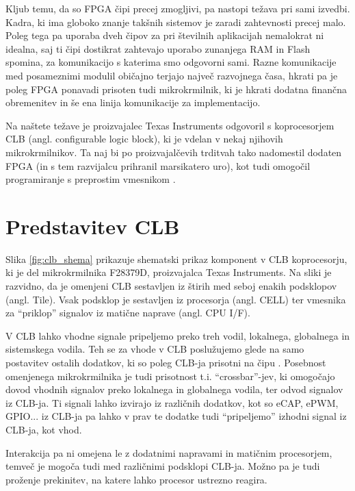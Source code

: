 \documentclass[a4paper]{article}
\begin{document}
Kljub temu, da so FPGA čipi precej zmogljivi, pa nastopi težava pri sami izvedbi. Kadra, ki ima globoko znanje takšnih sistemov je zaradi zahtevnosti precej malo. Poleg tega pa uporaba dveh čipov za pri številnih aplikacijah nemalokrat ni idealna, saj ti čipi dostikrat zahtevajo uporabo zunanjega RAM in Flash spomina, za komunikacijo s katerima smo odgovorni sami. Razne komunikacije med posameznimi modulil običajno terjajo največ razvojnega časa, hkrati pa je poleg FPGA ponavadi prisoten tudi mikrokrmilnik, ki je hkrati dodatna finančna obremenitev in še ena linija komunikacije za implementacijo.

Na naštete težave je proizvajalec Texas Instruments odgovoril s koprocesorjem CLB (angl. configurable logic block), ki je vdelan v nekaj njihovih mikrokrmilnikov. Ta naj bi po proizvajalčevih trditvah tako nadomestil dodaten FPGA (in s tem razvijalcu prihranil marsikatero uro), kot tudi omogočil programiranje s preprostim vmesnikom \cite{clb-intro}.



\section{Predstavitev CLB}\label{sec:predstavitev}
Slika \ref{fig:clb_shema} prikazuje shematski prikaz komponent v CLB koprocesorju, ki je del mikrokrmilnika F28379D, proizvajalca Texas Instruments. Na sliki je razvidno, da je omenjeni CLB sestavljen iz štirih med seboj enakih podsklopov (angl. Tile). Vsak podsklop je sestavljen iz procesorja (angl. CELL) ter vmesnika za ``priklop'' signalov iz matične naprave (angl. CPU I/F).

V CLB lahko vhodne signale pripeljemo preko treh vodil, lokalnega, globalnega in sistemskega vodila. Teh se za vhode v CLB poslužujemo glede na samo postavitev ostalih dodatkov, ki so poleg CLB-ja prisotni na čipu \cite[Pogl.~26.3]{mcu-ref-manual}. Posebnost omenjenega mikrokrmilnika je tudi prisotnost t.i. ``crossbar''-jev, ki omogočajo dovod vhodnih signalov preko lokalnega in globalnega vodila, ter odvod signalov iz CLB-ja. Ti signali lahko izvirajo iz različnih dodatkov, kot so eCAP, ePWM, GPIO... iz CLB-ja pa lahko v prav te dodatke tudi ``pripeljemo'' izhodni signal iz CLB-ja, kot vhod.

Interakcija pa ni omejena le z dodatnimi napravami in matičnim procesorjem, temveč je mogoča tudi med različnimi podsklopi CLB-ja. Možno pa je tudi proženje prekinitev, na katere lahko procesor ustrezno reagira.
\end{document}
